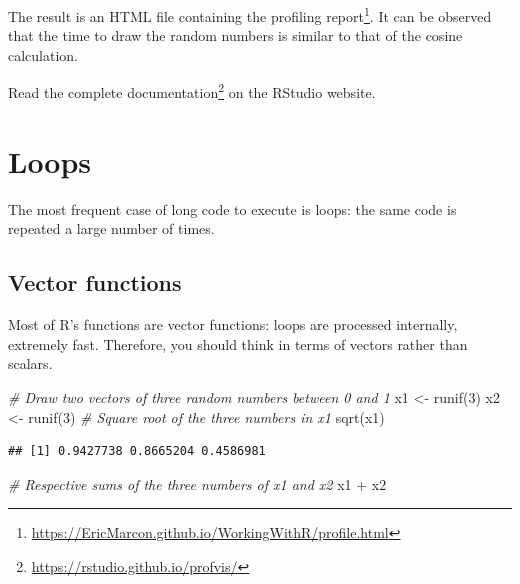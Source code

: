 \documentclass[
  12pt,
  american,
  a4paper,
  extrafontsizes,onecolumn,openright
  ]{memoir}
\newenvironment{Shaded}{\begin{snugshade}}{\end{snugshade}}
\newcommand{\CommentTok}[1]{\textcolor[rgb]{0.56,0.35,0.01}{\textit{#1}}}
\newcommand{\DecValTok}[1]{\textcolor[rgb]{0.00,0.00,0.81}{#1}}
\newcommand{\FunctionTok}[1]{\textcolor[rgb]{0.00,0.00,0.00}{#1}}
\newcommand{\NormalTok}[1]{#1}
\newcommand{\OtherTok}[1]{\textcolor[rgb]{0.56,0.35,0.01}{#1}}
\newcommand{\SpecialCharTok}[1]{\textcolor[rgb]{0.00,0.00,0.00}{#1}}
\begin{document}
\normalsize

The result is an HTML file containing the profiling report\footnote{\url{https://EricMarcon.github.io/WorkingWithR/profile.html}}.
It can be observed that the time to draw the random numbers is similar to that of the cosine calculation.

Read the complete documentation\footnote{\url{https://rstudio.github.io/profvis/}} on the RStudio website.

\hypertarget{loops}{%
\section{Loops}\label{loops}}

The most frequent case of long code to execute is loops: the same code is repeated a large number of times.

\hypertarget{vector-functions}{%
\subsection{Vector functions}\label{vector-functions}}

Most of R's functions are vector functions: loops are processed internally, extremely fast.
Therefore, you should think in terms of vectors rather than scalars.

\scriptsize

\begin{Shaded}
\begin{Highlighting}[]
\CommentTok{\# Draw two vectors of three random numbers between 0 and 1}
\NormalTok{x1 }\OtherTok{\textless{}{-}} \FunctionTok{runif}\NormalTok{(}\DecValTok{3}\NormalTok{)}
\NormalTok{x2 }\OtherTok{\textless{}{-}} \FunctionTok{runif}\NormalTok{(}\DecValTok{3}\NormalTok{)}
\CommentTok{\# Square root of the three numbers in x1}
\FunctionTok{sqrt}\NormalTok{(x1)}
\end{Highlighting}
\end{Shaded}

\begin{verbatim}
## [1] 0.9427738 0.8665204 0.4586981
\end{verbatim}

\begin{Shaded}
\begin{Highlighting}[]
\CommentTok{\# Respective sums of the three numbers of x1 and x2}
\NormalTok{x1 }\SpecialCharTok{+}\NormalTok{ x2}
\end{Highlighting}
\end{Shaded}
\end{document}
